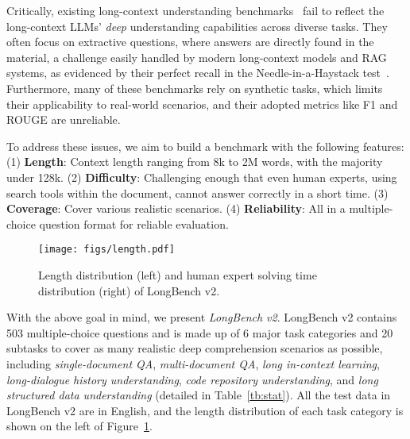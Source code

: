 Critically, existing long-context understanding benchmarks~\cite{bai2024longbench,zhang2024infty,hsieh2024ruler} fail to reflect the long-context LLMs' \emph{deep} understanding capabilities across diverse tasks.
They often focus on extractive questions, where answers are directly found in the material, a challenge easily handled by modern long-context models and RAG systems, as evidenced by their perfect recall in the Needle-in-a-Haystack test~\cite{needleinhaystack}.
Furthermore, many of these benchmarks rely on synthetic tasks, which limits their applicability to real-world scenarios, and their adopted metrics like F1 and ROUGE are unreliable.

To address these issues, we aim to build a benchmark with the following features: 
(1) \textbf{Length}: Context length ranging from 8k to 2M words, with the majority under 128k.
(2) \textbf{Difficulty}: Challenging enough that even human experts, using search tools within the document, cannot answer correctly in a short time.
(3) \textbf{Coverage}: Cover various realistic scenarios.
(4) \textbf{Reliability}: All in a multiple-choice question format for reliable evaluation.

\begin{figure}[t]
    \centering
    \texttt{[image: figs/length.pdf]}
    \caption{Length distribution (left) and human expert solving time distribution (right) of LongBench v2.}
    \label{fig:length}
\end{figure}

With the above goal in mind, we present \emph{LongBench v2}.
LongBench v2 contains 503 multiple-choice questions and is made up of 6 major task categories and 20 subtasks to cover as many realistic deep comprehension scenarios as possible, including \emph{single-document QA}, \emph{multi-document QA}, \emph{long in-context learning}, \emph{long-dialogue history understanding}, \emph{code repository understanding}, and \emph{long structured data understanding} (detailed in Table~\ref{tb:stat}).
All the test data in LongBench v2 are in English, and the length distribution of each task category is shown on the left of Figure~\ref{fig:length}.

